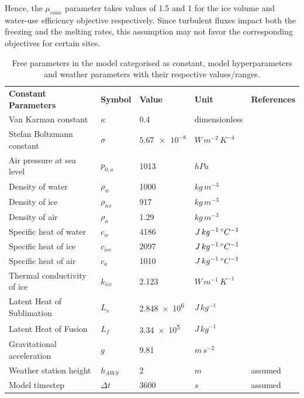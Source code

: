 \documentclass[tc, manuscript]{copernicus}
\begin{document}
Hence, the $\mu_{cone}$ parameter takes values of 1.5 and 1 for the ice volume and water-use efficiency
objective respectively.  Since turbulent fluxes impact both the freezing and the melting rates, this assumption
may not favor the corresponding objectives for certain sites.

\appendixtables   %

\begin{table}
  \caption{Free parameters in the model categorised as constant, model hyperparameters and weather 
  parameters with their respective values/ranges.}

	\label{tab:parameters}
	\begin{tabular}{lllll}
		\toprule

		\textbf{Constant Parameters}                       & \textbf{Symbol} & \textbf{Value} &
    \textbf{Unit} & \textbf{References} \\
    Van Karman constant & $\kappa$      & 0.4        &dimensionless & \citet{cuffeyPhysicsGlaciers2010}              \\
    Stefan Boltzmann constant & $\sigma$ & $\num{5.67 e-8} $& $W\, m^{-2}\, K^{-4}$ & \citet{cuffeyPhysicsGlaciers2010}\\
    Air pressure at sea level & $p_{0,a}$ & 1013 & $hPa$  & \citet{molgAblationAssociatedEnergy2004}\\
    Density of water & $\rho_{w}$ & 1000 & $kg\, m^{-3}$    & \citet{cuffeyPhysicsGlaciers2010}\\
    Density of ice & $\rho_{ice}$ & 917 & $kg\, m^{-3}$ & \citet{cuffeyPhysicsGlaciers2010}\\
    Density of air & $\rho_{a}$ &  1.29 & $kg\, m^{-3}$   & \citet{molgAblationAssociatedEnergy2004}\\
    Specific heat of water & $c_{w}$ & 4186 & $J\, kg^{-1}\,^{\circ} C^{-1}$  & \citet{cuffeyPhysicsGlaciers2010}\\
    Specific heat of ice & $c_{ice}$ & 2097 & $J\, kg^{-1}\,^{\circ} C^{-1}$ & \citet{cuffeyPhysicsGlaciers2010}\\
    Specific heat of air & $c_{a}$ & 1010 & $J\, kg^{-1}\,^{\circ} C^{-1}$ & \citet{molgAblationAssociatedEnergy2004}\\
    Thermal conductivity of ice & $k_{ice}$ & 2.123  & $W\, m^{-1}\, K^{-1}$ & \citet{bonalesThermalConductivityIce2017} \\
    Latent Heat of Sublimation & $L_{s}$ & \num{2.848e6}  & $J\, kg^{-1}$ &   \citet{cuffeyPhysicsGlaciers2010}\\
    Latent Heat of Fusion & $L_{f}$ & \num{3.34e5} & $J\, kg^{-1}$ & \citet{cuffeyPhysicsGlaciers2010}\\
    Gravitational acceleration & $g$ & 9.81 & $m\, s^{-2}$ &\citet{cuffeyPhysicsGlaciers2010}\\
    Weather station height & $h_{AWS}$ & 2 & $m$ & assumed \\
    Model timestep                            & $\Delta t$            & $3600$           & $s$ & assumed \\\midrule


\end{tabular}
\end{table}
\end{document}

